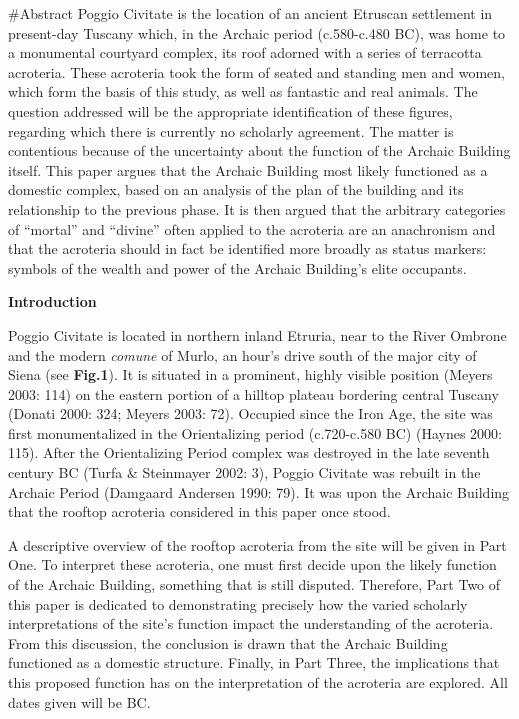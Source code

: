 \#Abstract Poggio Civitate is the location of an ancient Etruscan
settlement in present-day Tuscany which, in the Archaic period
(c.580-c.480 BC), was home to a monumental courtyard complex, its roof
adorned with a series of terracotta acroteria. These acroteria took the
form of seated and standing men and women, which form the basis of this
study, as well as fantastic and real animals. The question addressed
will be the appropriate identification of these figures, regarding which
there is currently no scholarly agreement. The matter is contentious
because of the uncertainty about the function of the Archaic Building
itself. This paper argues that the Archaic Building most likely
functioned as a domestic complex, based on an analysis of the plan of
the building and its relationship to the previous phase. It is then
argued that the arbitrary categories of ``mortal'' and ``divine'' often
applied to the acroteria are an anachronism and that the acroteria
should in fact be identified more broadly as status markers: symbols of
the wealth and power of the Archaic Building's elite occupants.

\textbf{Introduction}

Poggio Civitate is located in northern inland Etruria, near to the River
Ombrone and the modern \emph{comune} of Murlo, an hour's drive south of
the major city of Siena (see \textbf{Fig.1}). It is situated in a
prominent, highly visible position (Meyers 2003: 114) on the eastern
portion of a hilltop plateau bordering central Tuscany (Donati 2000:
324; Meyers 2003: 72). Occupied since the Iron Age, the site was first
monumentalized in the Orientalizing period (c.720-c.580 BC) (Haynes
2000: 115). After the Orientalizing Period complex was destroyed in the
late seventh century BC (Turfa \& Steinmayer 2002: 3), Poggio Civitate
was rebuilt in the Archaic Period (Damgaard Andersen 1990: 79). It was
upon the Archaic Building that the rooftop acroteria considered in this
paper once stood.

A descriptive overview of the rooftop acroteria from the site will be
given in Part One. To interpret these acroteria, one must first decide
upon the likely function of the Archaic Building, something that is
still disputed. Therefore, Part Two of this paper is dedicated to
demonstrating precisely how the varied scholarly interpretations of the
site's function impact the understanding of the acroteria. From this
discussion, the conclusion is drawn that the Archaic Building functioned
as a domestic structure. Finally, in Part Three, the implications that
this proposed function has on the interpretation of the acroteria are
explored. All dates given will be BC.


